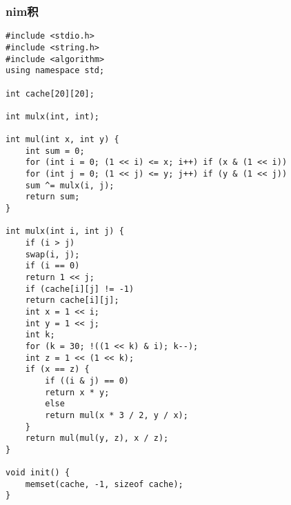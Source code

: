 \subsubsection{nim积}
\begin{verbatim}
#include <stdio.h>
#include <string.h>
#include <algorithm>
using namespace std;

int cache[20][20];

int mulx(int, int);

int mul(int x, int y) {
    int sum = 0;
    for (int i = 0; (1 << i) <= x; i++) if (x & (1 << i))
    for (int j = 0; (1 << j) <= y; j++) if (y & (1 << j))
    sum ^= mulx(i, j);
    return sum;
}

int mulx(int i, int j) {
    if (i > j)
    swap(i, j);
    if (i == 0)
    return 1 << j;
    if (cache[i][j] != -1)
    return cache[i][j];
    int x = 1 << i;
    int y = 1 << j;
    int k;
    for (k = 30; !((1 << k) & i); k--);
    int z = 1 << (1 << k);
    if (x == z) {
        if ((i & j) == 0)
        return x * y;
        else
        return mul(x * 3 / 2, y / x);
    }
    return mul(mul(y, z), x / z);
}

void init() {
    memset(cache, -1, sizeof cache);
}
\end{verbatim}
